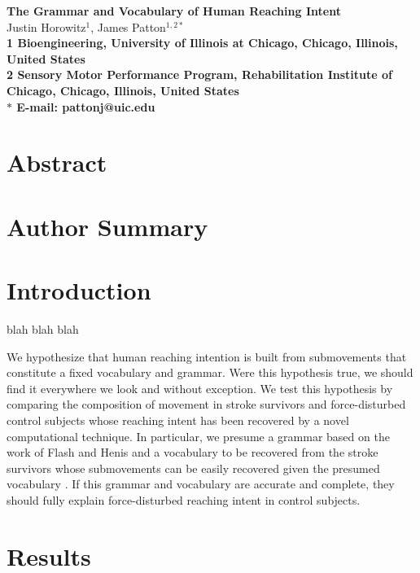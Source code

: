 \documentclass[10pt]{article}
\date{}
\begin{document}
\begin{flushleft}
{\Large
\textbf{The Grammar and Vocabulary of Human Reaching Intent}
}
\\
Justin Horowitz$^{1}$, 
James Patton$^{1,2\ast}$
\\
\bf{1} Bioengineering, University of Illinois at Chicago, Chicago, Illinois, United States
\\
\bf{2} Sensory Motor Performance Program, Rehabilitation Institute of Chicago, Chicago, Illinois, United States
\\
$\ast$ E-mail: pattonj@uic.edu
\end{flushleft}

\section*{Abstract}

\section*{Author Summary}

\section*{Introduction}
blah blah blah

We hypothesize that human reaching intention is built from submovements that constitute a fixed vocabulary and grammar. Were this hypothesis true, we should find it everywhere we look and without exception. We test this hypothesis by comparing the composition of movement in stroke survivors and force-disturbed control subjects whose reaching intent has been recovered by a novel computational technique. In particular, we presume a grammar based on the work of Flash and Henis \cite{flash1991arm} and a vocabulary to be recovered from the stroke survivors whose submovements can be easily recovered given the presumed vocabulary \cite{rohrer2004submovements}. If this grammar and vocabulary are accurate and complete, they should fully explain force-disturbed reaching intent in control subjects.

\section*{Results}
\end{document}
